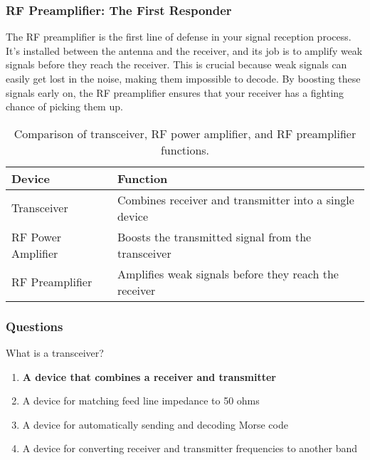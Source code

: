 \subsubsection*{RF Preamplifier: The First Responder}
The RF preamplifier is the first line of defense in your signal reception process. It's installed between the antenna and the receiver, and its job is to amplify weak signals before they reach the receiver. This is crucial because weak signals can easily get lost in the noise, making them impossible to decode. By boosting these signals early on, the RF preamplifier ensures that your receiver has a fighting chance of picking them up.


\begin{table}[h!]
    \centering
    \begin{tabular}{|l|l|}
        \hline
        \textbf{Device} & \textbf{Function} \\
        \hline
        Transceiver & Combines receiver and transmitter into a single device \\
        RF Power Amplifier & Boosts the transmitted signal from the transceiver \\
        RF Preamplifier & Amplifies weak signals before they reach the receiver \\
        \hline
    \end{tabular}
    \caption{Comparison of transceiver, RF power amplifier, and RF preamplifier functions.}
    \label{tab:comparison-functions}
\end{table}

\subsubsection*{Questions}

\begin{tcolorbox}[colback=gray!10!white,colframe=black!75!black,title={T7A02}]
    What is a transceiver?
    \begin{enumerate}[label=\Alph*),noitemsep]
        \item \textbf{A device that combines a receiver and transmitter}
        \item A device for matching feed line impedance to 50 ohms
        \item A device for automatically sending and decoding Morse code
        \item A device for converting receiver and transmitter frequencies to another band
    \end{enumerate}
\end{tcolorbox}

